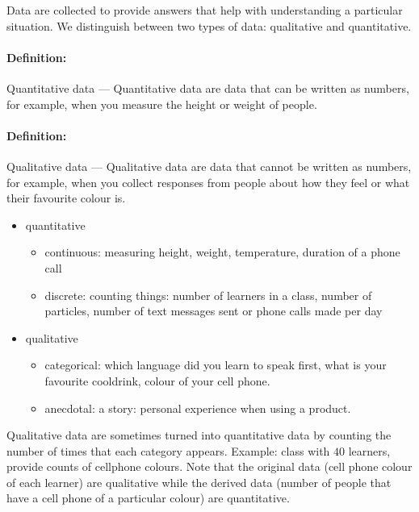 \documentclass[a4paper,11pt]{report}
\def\Definition#1#2{\paragraph{Definition:} #1 --- #2}
\begin{document}
Data are collected to provide answers that help with understanding a
particular situation. We distinguish between two types of data:
qualitative and quantitative.

\Definition{Quantitative data}{Quantitative data are data that can be
  written as numbers, for example, when you measure the height or
  weight of people.}

\Definition{Qualitative data}{Qualitative data are data that cannot be
  written as numbers, for example, when you collect responses from
  people about how they feel or what their favourite colour is.}

\begin{itemize}
\item quantitative
  \begin{itemize}
  \item continuous: measuring height, weight, temperature, duration of
    a phone call
  \item discrete: counting things: number of learners in a class,
    number of particles, number of text messages sent or phone calls
    made per day
  \end{itemize}
\item qualitative
  \begin{itemize}
  \item categorical: which language did you learn to speak first, what
    is your favourite cooldrink, colour of your cell phone.
  \item anecdotal: a story: personal experience when using a product.
  \end{itemize}
\end{itemize}

Qualitative data are sometimes turned into quantitative data by
counting the number of times that each category appears.
Example: class with $40$ learners, provide counts of cellphone
colours. Note that the original data (cell phone colour of each
learner) are qualitative while the derived data (number of people that
have a cell phone of a particular colour) are quantitative.
\end{document}
